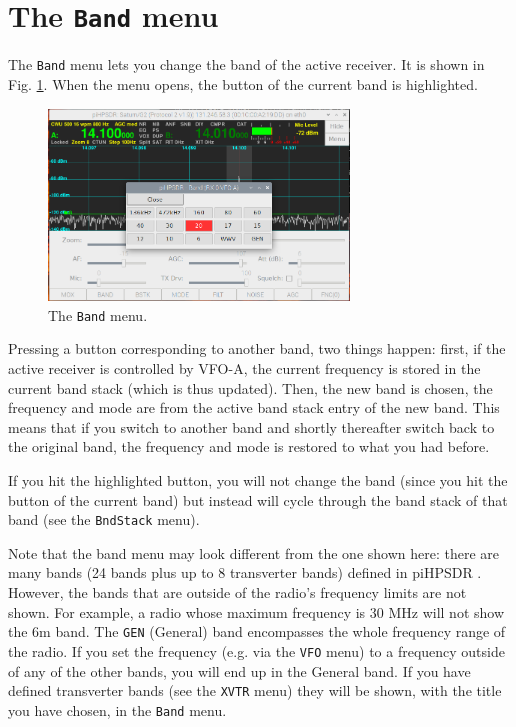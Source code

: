 \documentclass[12pt]{book}
\def\rett#1{\texttt{\color{red}#1}}
\def\bltt#1{\texttt{\color{blue}#1}}
\def\pH{pi\-HPSDR }
\begin{document}
\section{The \texttt{Band} menu}
\label{sec:bandmenu}
The \bltt{Band} menu lets you change the band of the active receiver. It is shown
in Fig. \ref{fig:BandMenu}. When the menu opens, the button of the current band
is highlighted.

\begin{figure}[ht]
\center
\includegraphics[width=8cm]{BandMenu.png}
\caption{The \bltt{Band} menu.}
\label{fig:BandMenu}
\end{figure}

Pressing a button corresponding to another band, two things happen: first, if the
active receiver is controlled by VFO-A, the current frequency is stored in the current
band stack (which is thus updated). Then, the new band is chosen, the frequency and mode
are from the active band stack entry of the new band. This means that if you switch
to another band and shortly thereafter switch back to the original band, the
frequency and mode is restored to what you had before.

If you hit the highlighted button, you will not change the band (since you hit the
button of the current band) but instead will cycle through the band stack of that band
(see the \bltt{BndStack} menu).


Note that the band menu may look different from the one shown here: there are many bands
(24 bands plus up to 8 transverter bands) defined in \pH. However, the bands that
are outside of the radio's frequency limits are not shown. For example, a radio
whose maximum frequency is 30 MHz will not show the 6m band. The \rett{GEN} (General)
band encompasses the whole frequency range of the radio. If you set the frequency
(e.g. via the \bltt{VFO} menu) to a frequency outside of any of the other bands, you
will end up in the General band. If you have defined transverter bands (see the
\bltt{XVTR} menu) they will be shown, with the title you have chosen, in the
\bltt{Band} menu.
\end{document}
